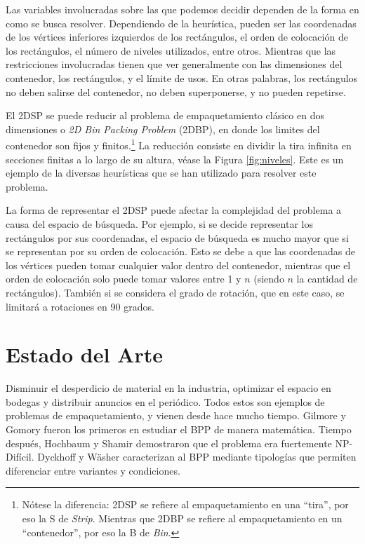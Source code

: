 \documentclass[letter, 10pt]{article}
\begin{document}
Las variables involucradas sobre las que podemos decidir dependen de la forma en como se busca resolver. Dependiendo de la heurística, pueden ser las coordenadas de los vértices inferiores izquierdos de los rectángulos, el orden de colocación de los rectángulos, el número de niveles utilizados, entre otros. Mientras que las restricciones involucradas tienen que ver generalmente con las dimensiones del contenedor, los rectángulos, y el límite de usos. En otras palabras, los rectángulos no deben salirse del contenedor, no deben superponerse, y no pueden repetirse.

El 2DSP se puede reducir al problema de empaquetamiento clásico en dos dimensiones o \textit{2D Bin Packing Problem} (2DBP), en donde los limites del contenedor son fijos y finitos.\footnote{Nótese la diferencia: 2DSP se refiere al empaquetamiento en una ``tira'', por eso la S de \textit{Strip}. Mientras que 2DBP se refiere al empaquetamiento en un ``contenedor'', por eso la B de \textit{Bin}.} La reducción consiste en dividir la tira infinita en secciones finitas a lo largo de su altura, véase la Figura \ref{fig:niveles}. \cite{lodi2004models} Este es un ejemplo de la diversas heurísticas que se han utilizado para resolver este problema.

La forma de representar el 2DSP puede afectar la complejidad del problema a causa del espacio de búsqueda. Por ejemplo, si se decide representar los rectángulos por sus coordenadas, el espacio de búsqueda es mucho mayor que si se representan por su orden de colocación. Esto se debe a que las coordenadas de los vértices pueden tomar cualquier valor dentro del contenedor, mientras que el orden de colocación solo puede tomar valores entre 1 y $n$ (siendo $n$ la cantidad de rectángulos). También si se considera el grado de rotación, que en este caso, se limitará a rotaciones en 90 grados.





\section{Estado del Arte}


Disminuir el desperdicio de material en la industria, optimizar el espacio en bodegas y distribuir anuncios en el periódico. Todos estos son ejemplos de problemas de empaquetamiento, y vienen desde hace mucho tiempo. Gilmore y Gomory \cite{gilmore1961linear} fueron los primeros en estudiar el BPP de manera matemática. Tiempo después, Hochbaum y Shamir \cite{hochbaum1985approximation} demostraron que el problema era fuertemente NP-Difícil. Dyckhoff \cite{dyckhoff1990Typo} y Wäsher \cite{wascher2007Typo} caracterizan al BPP mediante tipologías que permiten diferenciar entre variantes y condiciones.
\end{document}
